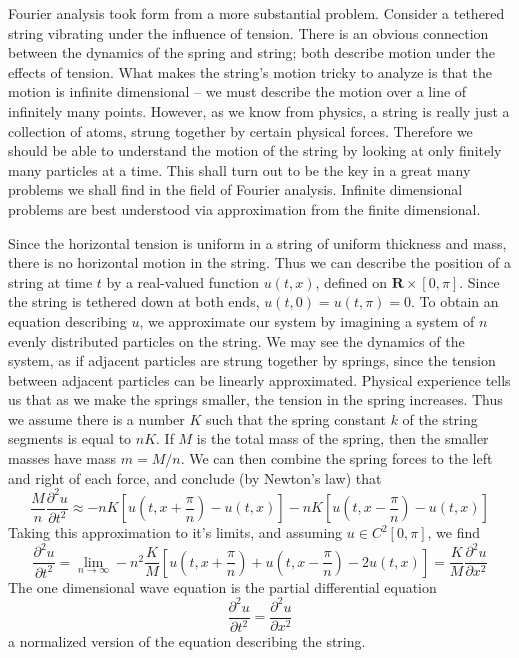 Fourier analysis took form from a more substantial problem. Consider a tethered string vibrating under the influence of tension. There is an obvious connection between the dynamics of the spring and string; both describe motion under the effects of tension. What makes the string's motion tricky to analyze is that the motion is infinite dimensional -- we must describe the motion over a line of infinitely many points. However, as we know from physics, a string is really just a collection of atoms, strung together by certain physical forces. Therefore we should be able to understand the motion of the string by looking at only finitely many particles at a time. This shall turn out to be the key in a great many problems we shall find in the field of Fourier analysis. Infinite dimensional problems are best understood via approximation from the finite dimensional.

Since the horizontal tension is uniform in a string of uniform thickness and mass, there is no horizontal motion in the string. Thus we can describe the position of a string at time $t$ by a real-valued function $u(t,x)$, defined on $\mathbf{R} \times [0,\pi]$. Since the string is tethered down at both ends, $u(t,0) = u(t,\pi) = 0$. To obtain an equation describing $u$, we approximate our system by imagining a system of $n$ evenly distributed particles on the string. We may see the dynamics of the system, as if adjacent particles are strung together by springs, since the tension between adjacent particles can be linearly approximated. Physical experience tells us that as we make the springs smaller, the tension in the spring increases. Thus we assume there is a number $K$ such that the spring constant $k$ of the string segments is equal to $nK$. If $M$ is the total mass of the spring, then the smaller masses have mass $m = M/n$. We can then combine the spring forces to the left and right of each force, and conclude (by Newton's law) that
%
\[ \frac{M}{n} \frac{\partial^2 u}{\partial t^2} \approx - nK \left[u\left(t, x + \frac{\pi}{n}\right) - u(t, x)\right] - nK \left[ u\left(t, x - \frac{\pi}{n}\right) - u(t, x) \right] \]
%
Taking this approximation to it's limits, and assuming $u \in C^2[0,\pi]$, we find
%
\[ \frac{\partial^2 u}{\partial t^2} = \lim_{n \to \infty} -n^2 \frac{K}{M} \left[ u\left(t, x + \frac{\pi}{n}\right) + u\left(t,x - \frac{\pi}{n}\right) - 2u(t,x) \right] = \frac{K}{M} \frac{\partial^2 u}{\partial x^2} \]
%
The one dimensional wave equation is the partial differential equation
%
\[ \frac{\partial^2 u}{\partial t^2} = \frac{\partial^2 u}{\partial x^2} \]
%
a normalized version of the equation describing the string.

